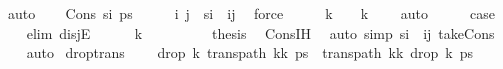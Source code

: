\begin{isabellebody}
\ auto\isanewline
{}\isamarkupfalse%
\isanewline
\ \ \isamarkupfalse%
\ {\isacharparenleft}{\kern0pt}Cons\ s\isactrlsub i\ ps{\isacharparenright}{\kern0pt}\isanewline
\ \ \isamarkupfalse%
\ \isamarkupfalse%
\ i\ j\ \ {\isachardoublequoteopen}s\isactrlsub i\ {\isacharequal}{\kern0pt}\ {\isacharparenleft}{\kern0pt}i{\isacharcomma}{\kern0pt}j{\isacharparenright}{\kern0pt}{\isachardoublequoteclose}\ \isamarkupfalse%
\ force\isanewline
\ \ \isamarkupfalse%
\ \isamarkupfalse%
\ {\isachardoublequoteopen}k\ {\isacharequal}{\kern0pt}\ {}\ {\isasymor}\ k\ {\isachargreater}{\kern0pt}\ {}{\isachardoublequoteclose}\ \isamarkupfalse%
\ auto\isanewline
\ \ \isamarkupfalse%
\ \isamarkupfalse%
\ {\isacharquery}{\kern0pt}case\ \isanewline
\ \ \isamarkupfalse%
\ {\isacharparenleft}{\kern0pt}elim\ disjE{\isacharparenright}{\kern0pt}\isanewline
\ \ \ \ \isamarkupfalse%
\ {\isachardoublequoteopen}k\ {\isachargreater}{\kern0pt}\ {}{\isachardoublequoteclose}\isanewline
\ \ \ \ \isamarkupfalse%
\ \isamarkupfalse%
\ {\isacharquery}{\kern0pt}thesis\ \isamarkupfalse%
\ Cons{\isachardot}{\kern0pt}IH\ \isamarkupfalse%
\ {\isacharparenleft}{\kern0pt}auto\ simp{\isacharcolon}{\kern0pt}\ {\isacartoucheopen}s\isactrlsub i\ {\isacharequal}{\kern0pt}\ {\isacharparenleft}{\kern0pt}i{\isacharcomma}{\kern0pt}j{\isacharparenright}{\kern0pt}{\isacartoucheclose}\ take{\isacharunderscore}{\kern0pt}Cons{\isacharprime}{\kern0pt}{\isacharparenright}{\kern0pt}\isanewline
\ \ \isamarkupfalse%
\ auto\isanewline
{}\isamarkupfalse%
%
\endisatagproof
{\isafoldproof}%
%
\isadelimproof
\isanewline
%
\endisadelimproof
\isanewline
{}\isamarkupfalse%
\ drop{\isacharunderscore}{\kern0pt}trans{\isacharcolon}{\kern0pt}\ \isanewline
\ \ \ {\isachardoublequoteopen}drop\ k\ {\isacharparenleft}{\kern0pt}trans{\isacharunderscore}{\kern0pt}path\ {\isacharparenleft}{\kern0pt}kk\ ps{\isacharparenright}{\kern0pt}\ {\isacharequal}{\kern0pt}\ trans{\isacharunderscore}{\kern0pt}path\ {\isacharparenleft}{\kern0pt}kk\ {\isacharparenleft}{\kern0pt}drop\ k\ ps{\isacharparenright}{\kern0pt}{\isachardoublequoteclose}\isanewline

\end{isabellebody}
